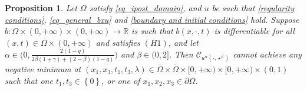 \documentclass[11pt, reqno]{amsart}
\newtheorem{proposition}[lemma]{Proposition}
\theoremstyle{definition}
\numberwithin{equation}{section}
\newcommand{\Omegabar}{\overline{\Omega}}
\newcommand{\R}{\mathbb{R}}
\begin{document}
\begin{proposition}\label{minimum not on the boundary}
	Let $\Omega$ satisfy \eqref{eq_ipost_domain}, and $u$ be such that \eqref{regularity conditions}, \eqref{eq_general_bxu} and \eqref{boundary and initial conditions} hold.
Suppose 		
$b\colon\Omega\times(0,+\infty)\times (0,+\infty)\to \R$ is such that $b(x,\cdot,t)$ is differentiable for all $(x,t)\in \Omega\times (0,+\infty)$ and satisfies \hyperlink{H1}{\( (H1) \)}, and let $\alpha \in \big(0, \frac{2(1-q)}{2\beta(1+\gamma)+(2-\beta)(1-q)}\big)$
and $\beta \in (0,2]$.
Then $\mathcal{C}_{u^\alpha(\cdot, \star^{\beta})}$ cannot achieve any negative minimum at $(x_1,x_3,t_1,t_3,\lambda)\in \Omegabar \times \Omegabar \times [0,+\infty)\times [0,+\infty)\times (0,1) $ such that one $t_1,t_3\in \left\{0\right\}$, or one of $x_1,x_2,x_3\in \partial \Omega$.
\end{proposition}
\end{document}
